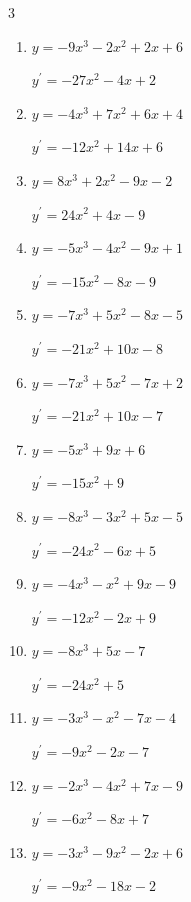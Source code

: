 \begin{multicols}{3}
\begin{enumerate}
  \item $y=-9x^{3}-2x^{2}+2x+6$

        $\displaystyle y^{\prime}=-27x^{2}-4x+2$

  \item $y=-4x^{3}+7x^{2}+6x+4$

        $\displaystyle y^{\prime}=-12x^{2}+14x+6$

  \item $y=8x^{3}+2x^{2}-9x-2$

        $\displaystyle y^{\prime}=24x^{2}+4x-9$

  \item $y=-5x^{3}-4x^{2}-9x+1$

        $\displaystyle y^{\prime}=-15x^{2}-8x-9$

  \item $y=-7x^{3}+5x^{2}-8x-5$

        $\displaystyle y^{\prime}=-21x^{2}+10x-8$

  \item $y=-7x^{3}+5x^{2}-7x+2$

        $\displaystyle y^{\prime}=-21x^{2}+10x-7$

  \item $y=-5x^{3}+9x+6$

        $\displaystyle y^{\prime}=-15x^{2}+9$

  \item $y=-8x^{3}-3x^{2}+5x-5$

        $\displaystyle y^{\prime}=-24x^{2}-6x+5$

  \item $y=-4x^{3}-x^{2}+9x-9$

        $\displaystyle y^{\prime}=-12x^{2}-2x+9$

\columnbreak %

  \item $y=-8x^{3}+5x-7$

        $\displaystyle y^{\prime}=-24x^{2}+5$

  \item $y=-3x^{3}-x^{2}-7x-4$

        $\displaystyle y^{\prime}=-9x^{2}-2x-7$

  \item $y=-2x^{3}-4x^{2}+7x-9$

        $\displaystyle y^{\prime}=-6x^{2}-8x+7$

  \item $y=-3x^{3}-9x^{2}-2x+6$

        $\displaystyle y^{\prime}=-9x^{2}-18x-2$


\end{enumerate}
\end{multicols}
